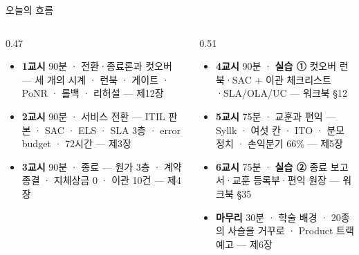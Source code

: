 \begin{frame}{오늘의 흐름}
\begin{columns}[T]
\begin{column}{0.47\textwidth}
\begin{itemize}
\item \textbf{1교시} 90분 · 전환·종료론과 컷오버 — 세 개의 시계 · 런북 · 게이트 · PoNR · 롤백 · 리허설 — 제1\til{}2장
\item \textbf{2교시} 90분 · 서비스 전환 — ITIL 판본 · SAC · ELS · SLA 3층 · error budget · 72시간 — 제3장
\item \textbf{3교시} 90분 · 종료 — 원가 3층 · 계약 종결 · 지체상금 0 · 이관 10건 — 제4장
\end{itemize}
\end{column}
\begin{column}{0.51\textwidth}
\begin{itemize}
\item \textbf{4교시} 90분 · \textbf{실습 ①} 컷오버 런북·SAC + 이관 체크리스트·SLA/OLA/UC — 워크북 §1\til{}2
\item \textbf{5교시} 75분 · 교훈과 편익 — Syllk · 여섯 칸 · ITO · 분모 정치 · 손익분기 66\% — 제5장
\item \textbf{6교시} 75분 · \textbf{실습 ②} 종료 보고서·교훈 등록부·편익 원장 — 워크북 §3\til{}5
\item \textbf{마무리} 30분 · 학술 배경 · 20종의 사슬을 거꾸로 · Product 트랙 예고 — 제6장
\end{itemize}
\end{column}
\end{columns}
\end{frame}

